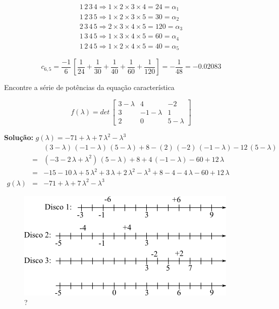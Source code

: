 \begin{itemize}
\begin{itemize}
\[
 \begin{array}{l}
  1 \, 2 \, 3 \, 4 \Rightarrow 1 \times 2 \times 3 \times 4 = 24 = \alpha_1\\
  1 \, 2 \, 3 \, 5 \Rightarrow 1 \times 2 \times 3 \times 5 = 30 = \alpha_2\\
  2 \, 3 \, 4 \, 5 \Rightarrow 2 \times 3 \times 4 \times 5 = 120 = \alpha_3\\
  1 \, 3 \, 4 \, 5 \Rightarrow 1 \times 3 \times 4 \times 5 = 60 = \alpha_4\\
  1 \, 2 \, 4 \, 5 \Rightarrow 1 \times 2 \times 4 \times 5 = 40 = \alpha_5
 \end{array}
\]

\[
 c_{6,5}
 = \frac{-1}{6} \, \left[ \frac{1}{24} + \frac{1}{30} + \frac{1}{40} + \frac{1}{60} + \frac{1}{120} \right]
 = - \frac{1}{48}
 = -0.02083
\]

\begin{example}

Encontre a série de potências da equação característica

\[
 f(\lambda)
 = det \,
 \left[
 \begin{array}{rrr}
  3-\lambda & 4          & -2\\
  3         & -1-\lambda & 1\\
  2         & 0          & 5-\lambda
 \end{array}
 \right]
\]

\textbf{Solução:} $ g(\lambda) = -71 + \lambda + 7 \, \lambda^2 - \lambda^3 $\\


\[
 \begin{array}{lll}
  & & (3-\lambda) \, (-1-\lambda) \, (5-\lambda) + 8 - (2) \, (-2) \, (-1-\lambda) - 12 \, (5-\lambda)\\
  & = & (-3 -2 \, \lambda + \lambda^2) \, (5 - \lambda) + 8 + 4 \, (-1 -\lambda) - 60 + 12 \, \lambda\\
  & = & -15 -10 \, \lambda + 5 \, \lambda^2 + 3 \, \lambda + 2 \, \lambda^2 - \lambda^3 + 8 - 4 -4 \, \lambda - 60 + 12 \, \lambda\\
  g(\lambda) & = & -71 + \lambda + 7 \, \lambda^2 - \lambda^3
 \end{array}
\]

\end{example}

\begin{figure}[htb]
 \centering
 \includegraphics[scale=0.8]{capitulos/capitulo5/figuras/met_inter3.png}
 \caption{?}
 \label{fig:met_inter3}
\end{figure}


\end{itemize}
\end{itemize}
